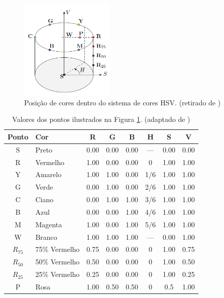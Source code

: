 \documentclass[	12pt, Times, openright, twoside, a4paper, english, brazil]{abntex2}
\begin{document}
\begin{figure}[!htb]
\centering \includegraphics[width=0.4\textwidth]{figuraHSV2.png}
\caption{Posição de cores dentro do sistema de cores HSV. (retirado de ) \label{fig:figuraHSV2}}
\end{figure}

\begin{table}[ht]
\centering
\begin{tabular}{clcccccc}
\hline      

\textbf{Ponto} & \textbf{Cor}              & \textbf{R} & \textbf{G} & \textbf{B} & \textbf{H} & \textbf{S} & \textbf{V}      \\ \hline
            S 	& Preto 		&0.00 	&0.00 	&0.00 	&— 	&0.00 	&0.00	\\ \hline
            R 	& Vermelho 		&1.00 	&0.00 	&0.00 	&0 	&1.00 	&1.00	\\ \hline
            Y 	&Amarelo 	&1.00 	&1.00 	&0.00 	&1/6 &1.00 	&1.00	\\ \hline
            G 	&Verde 		&0.00 	&1.00 	&0.00 	&2/6 &1.00 	&1.00	\\ \hline
            C 	&Ciano 		&0.00 	&1.00 	&1.00 	&3/6 &1.00 	&1.00	\\ \hline
            B 	&Azul 		&0.00 	&0.00 	&1.00 	&4/6 &1.00 	&1.00	\\ \hline
            M 	&Magenta 	&1.00 	&0.00 	&1.00 	&5/6 &1.00 	&1.00	\\ \hline
            W 	&Branco 		&1.00 	&1.00 	&1.00 	&— 	&0.00 	&1.00	\\ \hline
            $R_{75}$ &75\% Vermelho 	&0.75 	&0.00 	&0.00 	&0 	&1.00 	&0.75	\\ \hline
            $R_{50}$ &50\% Vermelho 	&0.50 	&0.00 	&0.00 	&0 	&1.00 	&0.50	\\ \hline
            $R_{25}$ &25\% Vermelho 	&0.25 	&0.00 	&0.00 	&0 	&1.00 	&0.25	\\ \hline
            P 	&Rosa 		&1.00 	&0.50 	&0.50 	&0 	&0.5 	&1.00	\\ \hline

\end{tabular}
\caption{Valores dos pontos ilustrados na Figura \ref{fig:figuraHSV2}. (adaptado de )}
\label{tab:exemploHSV}
\end{table}
\end{document}
